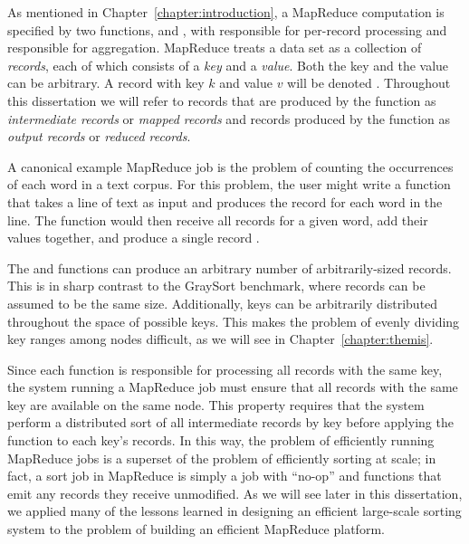 As mentioned in Chapter~\ref{chapter:introduction}, a MapReduce computation is
specified by two functions, \map and \reduce, with \map responsible for
per-record processing and \reduce responsible for aggregation. MapReduce treats
a data set as a collection of \emph{records}, each of which consists of a
\emph{key} and a \emph{value}. Both the key and the value can be arbitrary. A
record with key $k$ and value $v$ will be denoted .  Throughout
this dissertation we will refer to records that are produced by the \map
function as \emph{intermediate records} or \emph{mapped records} and records
produced by the \reduce function as \emph{output records} or \emph{reduced
  records}.

A canonical example MapReduce job is the problem of counting the occurrences of
each word in a text corpus. For this problem, the user might write a \map
function that takes a line of text as input and produces the record
 for each word in the line. The \reduce function would then
receive all records for a given word, add their values together, and produce a
single record .

The \map and \reduce functions can produce an arbitrary number of
arbitrarily-sized records. This is in sharp contrast to the GraySort benchmark,
where records can be assumed to be the same size. Additionally, keys can be
arbitrarily distributed throughout the space of possible keys. This makes the
problem of evenly dividing key ranges among nodes difficult, as we will see in
Chapter~\ref{chapter:themis}.

Since each \reduce function is responsible for processing all records with the
same key, the system running a MapReduce job must ensure that all records with
the same key are available on the same node. This property requires that the
system perform a distributed sort of all intermediate records by key before
applying the \reduce function to each key's records. In this way, the problem
of efficiently running MapReduce jobs is a superset of the problem of
efficiently sorting at scale; in fact, a sort job in MapReduce is simply a job
with ``no-op'' \map and \reduce functions that emit any records they receive
unmodified. As we will see later in this dissertation, we applied many of the
lessons learned in designing an efficient large-scale sorting system to the
problem of building an efficient MapReduce platform.
